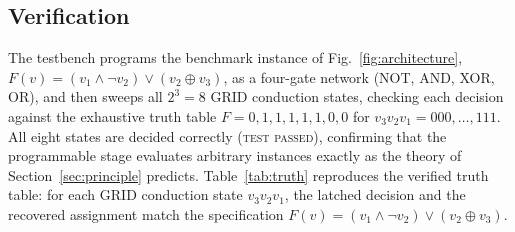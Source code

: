 \documentclass[letterpaper,journal]{IEEEtran}
\begin{document}
\subsection{Verification}
The testbench programs the benchmark instance of
Fig.~\ref{fig:architecture},
$F(v)=(v_1\land\lnot v_2)\lor(v_2\oplus v_3)$, as a four-gate network
(NOT, AND, XOR, OR), and then sweeps all $2^{3}=8$ GRID conduction states,
checking each decision against the exhaustive truth table
$F=0,1,1,1,1,1,0,0$ for $v_3v_2v_1=000,\dots,111$. All eight states are
decided correctly (\textsc{test passed}), confirming that the programmable
stage evaluates arbitrary instances exactly as the theory of
Section~\ref{sec:principle} predicts. Table~\ref{tab:truth} reproduces the
verified truth table: for each GRID conduction state $v_3v_2v_1$, the
latched decision and the recovered assignment match the specification
$F(v)=(v_1\land\lnot v_2)\lor(v_2\oplus v_3)$.
\end{document}
